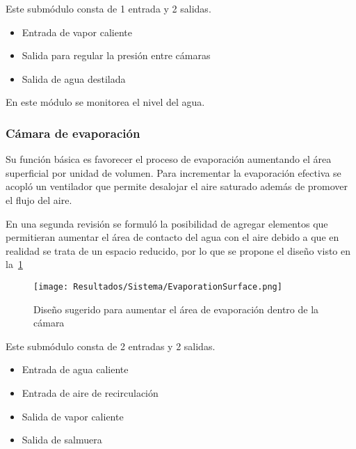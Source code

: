 				Este submódulo consta de 1 entrada y 2 salidas.
				
				\begin{itemize}[columns=2]
					\item Entrada de vapor caliente \columnbreak
					\item Salida para regular la presión entre cámaras
					\item Salida de agua destilada
				\end{itemize}
				
				\begin{center}
					En este módulo se monitorea el nivel del agua.
				\end{center}
							
			\subsubsection{Cámara de evaporación}
				
				Su función básica es favorecer el proceso de evaporación aumentando el área superficial por unidad de volumen. Para incrementar la evaporación efectiva se acopló un ventilador que permite desalojar el aire saturado además de promover el flujo del aire.
				
				En una segunda revisión se formuló la posibilidad de agregar elementos que permitieran aumentar el área de contacto del agua con el aire debido a que en realidad se trata de un espacio reducido, por lo que se propone el diseño visto en la~\cref{fig:EvaporationSurface}
				
				\begin{figure}[H]
					\centering
					\texttt{[image: Resultados/Sistema/EvaporationSurface.png]}
					\caption{Diseño sugerido para aumentar el área de evaporación dentro de la cámara}
					\label{fig:EvaporationSurface}
				\end{figure}
				
				Este submódulo consta de 2 entradas y 2 salidas.
				
				\begin{itemize}[columns=2]
					\item Entrada de agua caliente
					\item Entrada de aire de recirculación
					\item Salida de vapor caliente
					\item Salida de salmuera
				\end{itemize}
				
